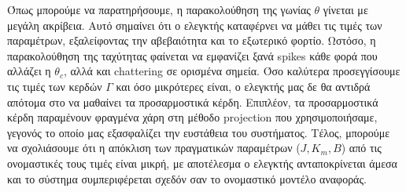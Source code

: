\documentclass{article}
\begin{document}
    \hfill\break
    Όπως μπορούμε να παρατηρήσουμε, η παρακολούθηση της γωνίας \(\theta\) γίνεται με μεγάλη ακρίβεια. Αυτό σημαίνει ότι ο ελεγκτής καταφέρνει να μάθει τις τιμές των παραμέτρων, εξαλείφοντας την αβεβαιότητα και το εξωτερικό φορτίο. Ωστόσο, η παρακολούθηση της ταχύτητας φαίνεται να εμφανίζει ξανά spikes κάθε φορά που αλλάζει η \(\theta_c\), αλλά και chattering σε ορισμένα σημεία. Όσο καλύτερα προσεγγίσουμε τις τιμές των κερδών \(\Gamma\) και όσο μικρότερες είναι, ο ελεγκτής μας δε θα αντιδρά απότομα στο να μαθαίνει τα προσαρμοστικά κέρδη. Επιπλέον, τα προσαρμοστικά κέρδη παραμένουν φραγμένα χάρη στη μέθοδο projection που χρησιμοποιήσαμε, γεγονός το οποίο μας εξασφαλίζει την ευστάθεια του συστήματος. Τέλος, μπορούμε να σχολιάσουμε ότι η απόκλιση των πραγματικών παραμέτρων ($J, K_m, B$) από τις ονομαστικές τους τιμές είναι μικρή, με αποτέλεσμα ο ελεγκτής ανταποκρίνεται άμεσα και το σύστημα συμπεριφέρεται σχεδόν σαν το ονομαστικό μοντέλο αναφοράς.
\end{document}
